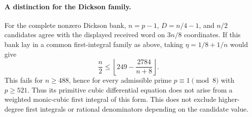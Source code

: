 \paragraph{A distinction for the Dickson family.}
For the complete nonzero Dickson bank, $n=p-1$, $D=n/4-1$, and
$n/2$ candidates agree with the displayed received word on $3n/8$
coordinates.  If this bank lay in a common first-integral family as
above, taking $\eta=1/8+1/n$ would give
\[
 \frac n2\le\left\lfloor249-\frac{2784}{n+8}\right\rfloor.
\]
This fails for $n\ge488$, hence for every admissible prime
$p\equiv1\pmod8$ with $p\ge521$.  Thus its primitive cubic differential
equation does not arise from a weighted monic-cubic first integral of
this form.  This does not exclude higher-degree first integrals or
rational denominators depending on the candidate value.
